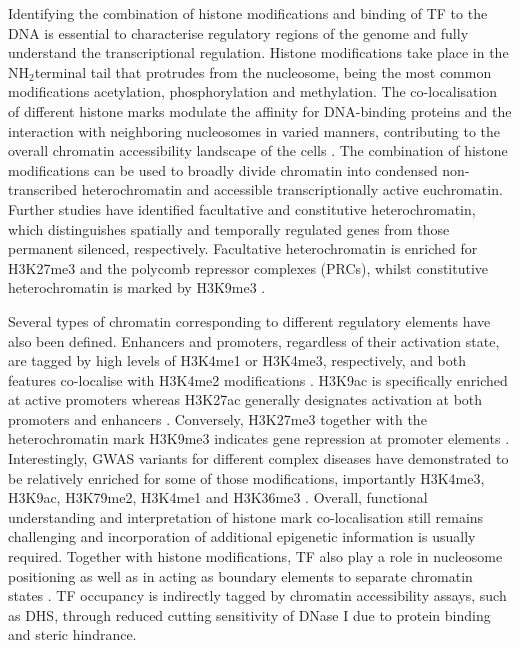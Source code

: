 Identifying the combination of histone modifications and binding of TF to the DNA is essential to characterise regulatory regions of the genome and fully understand the transcriptional regulation. Histone modifications take place in the NH$_2$terminal tail that protrudes from the nucleosome, being the most common modifications acetylation, phosphorylation and methylation. The co-localisation of different histone marks modulate the affinity for DNA-binding proteins and the interaction with neighboring nucleosomes in varied manners, contributing to the overall chromatin accessibility landscape of the cells \parencite{Jenuwein2001, Bannister2011}.
The combination of histone modifications can be used to broadly divide chromatin into condensed non-transcribed heterochromatin and accessible transcriptionally active euchromatin. Further studies have identified facultative and constitutive heterochromatin, which distinguishes spatially and temporally regulated genes from those permanent silenced, respectively. Facultative heterochromatin is enriched for H3K27me3 and the polycomb repressor complexes (PRCs), whilst constitutive heterochromatin is marked by H3K9me3 \parencite{Hansen2008,Bannister2001}.

 Several types of chromatin corresponding to different regulatory elements have also been defined. Enhancers and promoters, regardless of their activation state, are tagged by high levels of H3K4me1 or H3K4me3, respectively, and both features co-localise with H3K4me2 modifications \parencite{Heintzman2007,Hon2009}. H3K9ac is specifically enriched at active promoters whereas H3K27ac generally designates activation at both promoters and enhancers \parencite{Hon2009,Creyghton2010}. Conversely, H3K27me3 together with the heterochromatin mark H3K9me3 indicates gene repression at promoter elements \parencite{Hansen2008,Bannister2001,Pan2007}. Interestingly, GWAS variants for different complex diseases have demonstrated to be relatively enriched for some of those modifications, importantly H3K4me3, H3K9ac, H3K79me2, H3K4me1 and H3K36me3 \parencite{Ernst2011, Trynka2013}. Overall, functional understanding and interpretation of histone mark co-localisation still remains challenging and incorporation of additional epigenetic information is usually required. 
Together with histone modifications, TF also play a role in nucleosome positioning as well as in acting as boundary elements to separate chromatin states \parencite{Vierstra2014,Zhang2009,Bell2000}. TF occupancy is indirectly tagged by chromatin accessibility assays, such as DHS, through reduced cutting sensitivity of DNase I due to protein binding and steric hindrance. 

